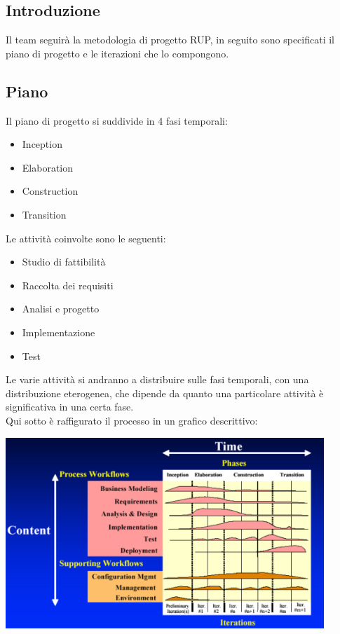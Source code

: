 \setlength{\arrayrulewidth}{.5mm}
\setlength{\tabcolsep}{5pt}
\renewcommand{\arraystretch}{2}

\subsection{Introduzione}
Il team seguirà la metodologia di progetto RUP, in seguito sono specificati il piano di progetto e le
iterazioni che lo compongono.

\subsection{Piano}
Il piano di progetto si suddivide in 4 fasi temporali:
\begin{itemize}
    \item Inception
    \item Elaboration
    \item Construction
    \item Transition
\end{itemize}
Le attività coinvolte sono le seguenti:
\begin{itemize}
    \item Studio di fattibilità
    \item Raccolta dei requisiti
    \item Analisi e progetto
    \item Implementazione
    \item Test
\end{itemize}
Le varie attività si andranno a distribuire sulle fasi temporali, con una distribuzione eterogenea, che
dipende da quanto una particolare attività è significativa in una certa fase.\\
Qui sotto è raffigurato il processo in un grafico descrittivo:

\includegraphics[width=12cm]{images/RUPplan.png}

